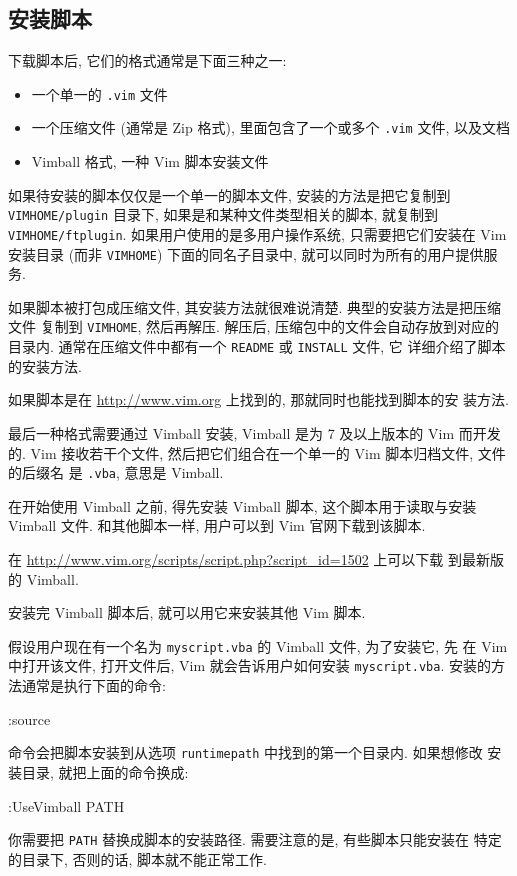 \subsection{安装脚本}
\label{subsec:installing_scripts}

下载脚本后, 它们的格式通常是下面三种之一:
\begin{itemize}
    \item 一个单一的 \texttt{.vim} 文件
    \item 一个压缩文件 (通常是 Zip 格式), 里面包含了一个或多个 \texttt{.vim}
        文件, 以及文档
    \item Vimball 格式, 一种 Vim 脚本安装文件
\end{itemize}

如果待安装的脚本仅仅是一个单一的脚本文件, 安装的方法是把它复制到
\texttt{VIMHOME/plugin} 目录下, 如果是和某种文件类型相关的脚本, 就复制到
\texttt{VIMHOME/ftplugin}.
如果用户使用的是多用户操作系统, 只需要把它们安装在 Vim 安装目录 (而非
\texttt{VIMHOME}) 下面的同名子目录中, 就可以同时为所有的用户提供服务.

如果脚本被打包成压缩文件, 其安装方法就很难说清楚. 典型的安装方法是把压缩文件
复制到 \texttt{VIMHOME}, 然后再解压. 解压后, 压缩包中的文件会自动存放到对应的
目录内. 通常在压缩文件中都有一个 \texttt{README} 或 \texttt{INSTALL} 文件, 它
详细介绍了脚本的安装方法.

\begin{warning}
    如果脚本是在 \url{http://www.vim.org} 上找到的, 那就同时也能找到脚本的安
    装方法.
\end{warning}

最后一种格式需要通过 Vimball 安装, Vimball 是为 7 及以上版本的 Vim 而开发的.
Vim 接收若干个文件, 然后把它们组合在一个单一的 Vim 脚本归档文件, 文件的后缀名
是 \texttt{.vba}, 意思是 Vimball.

在开始使用 Vimball 之前, 得先安装 Vimball 脚本, 这个脚本用于读取与安装 Vimball
文件. 和其他脚本一样, 用户可以到 Vim 官网下载到该脚本.

\begin{warning}
    在 \url{http://www.vim.org/scripts/script.php?script_id=1502} 上可以下载
    到最新版的 Vimball.
\end{warning}

安装完 Vimball 脚本后, 就可以用它来安装其他 Vim 脚本.

假设用户现在有一个名为 \texttt{myscript.vba} 的 Vimball 文件, 为了安装它, 先
在 Vim 中打开该文件, 打开文件后, Vim 就会告诉用户如何安装
\texttt{myscript.vba}. 安装的方法通常是执行下面的命令:
\begin{vimcode}
:source %
\end{vimcode}
命令会把脚本安装到从选项 \texttt{runtimepath} 中找到的第一个目录内. 如果想修改
安装目录, 就把上面的命令换成:
\begin{vimcode}
:UseVimball PATH
\end{vimcode}
你需要把 \texttt{PATH} 替换成脚本的安装路径. 需要注意的是, 有些脚本只能安装在
特定的目录下, 否则的话, 脚本就不能正常工作.

